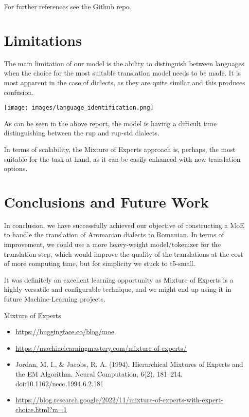 \documentclass[11pt]{article}
\begin{document}
For further references see the \href{https://github.com/Gheorghe-Nistor/archaeology}{Github repo}

\section{Limitations}
\label{section:limitations}
The main limitation of our model is the ability to distinguish between languages when the choice for the most suitable translation model needs to be made. It is most apparent in the case of dialects, as they are quite similar and this produces confusion.

\texttt{[image: images/language\_identification.png]}

As can be seen in the above report, the model is having a difficult time distinguishing between the rup and rup-std dialects.

In terms of scalability, the Mixture of Experts approach is, perhaps, the most suitable for the task at hand, as it can be easily enhanced with new translation options.

\section{Conclusions and Future Work}
\label{section:conclusions}

In conclusion, we have successfully achieved our objective of constructing a MoE to handle the translation of Aromanian dialects to Romanian. In terms of improvement, we could use a more heavy-weight model/tokenizer for the translation step, which would improve the quality of the translations at the cost of more computing time, but for simplicity we stuck to t5-small.

It was definitely an excellent learning opportunity as Mixture of Experts is a highly versatile and configurable technique, and we might end up using it in future Machine-Learning projects.






Mixture of Experts
\begin{itemize}
    \item \href{https://huggingface.co/blog/moe}{https://huggingface.co/blog/moe}
    \item \href{https://machinelearningmastery.com/mixture-of-experts/}{https://machinelearningmastery.com/mixture-of-experts/}
    \item Jordan, M. I., & Jacobs, R. A. (1994). Hierarchical Mixtures of Experts and the EM Algorithm. Neural Computation, 6(2), 181–214. doi:10.1162/neco.1994.6.2.181 
    \item \href{https://blog.research.google/2022/11/mixture-of-experts-with-expert-choice.html?m=1}{https://blog.research.google/2022/11/mixture-of-experts-with-expert-choice.html?m=1}
\end{itemize}
\end{document}
